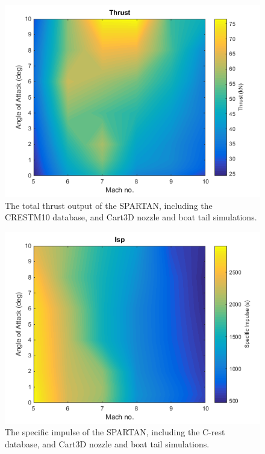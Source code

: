 \begin{figure}[ht]
	\centering
	\includegraphics[width=0.6\linewidth]{figures/3_vehicle_design/Thrust}
	\caption{The total thrust output of the SPARTAN, including the CRESTM10 database, and Cart3D nozzle and boat tail simulations.}
	\label{fig:Thrust}
\end{figure}

\begin{figure}[ht]
	\centering
	\includegraphics[width=0.6\linewidth]{figures/3_vehicle_design/Isp}
	\caption{The specific impulse of the SPARTAN, including the C-rest database, and Cart3D nozzle and boat tail simulations.}
	\label{fig:Isp}
\end{figure}


		
		
		
		
		
		
